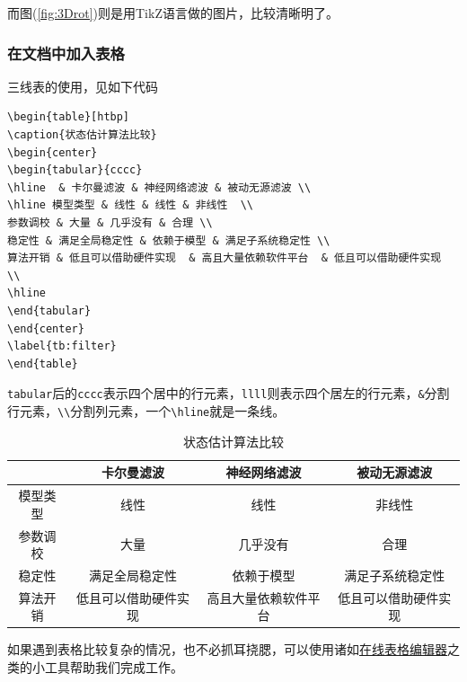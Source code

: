 而图(\ref{fig:3Drot})则是用TikZ语言做的图片，比较清晰明了。

\subsubsection{在文档中加入表格}
三线表的使用，见如下代码
\begin{lstlisting}
\begin{table}[htbp]
\caption{状态估计算法比较}
\begin{center}
\begin{tabular}{cccc}
\hline  & 卡尔曼滤波 & 神经网络滤波 & 被动无源滤波 \\ 
\hline 模型类型 & 线性 & 线性 & 非线性  \\ 
参数调校 & 大量 & 几乎没有 & 合理 \\ 
稳定性 & 满足全局稳定性 & 依赖于模型 & 满足子系统稳定性 \\ 
算法开销 & 低且可以借助硬件实现  & 高且大量依赖软件平台  & 低且可以借助硬件实现  \\ 
\hline
\end{tabular} 
\end{center}
\label{tb:filter}
\end{table}
\end{lstlisting}
\verb|tabular|后的\verb|cccc|表示四个居中的行元素，\verb|llll|则表示四个居左的行元素，\verb|&|分割行元素，\verb|\\|分割列元素，一个\verb|\hline|就是一条线。
\begin{table}[thbp]
	\caption{状态估计算法比较}
	\begin{center}
		\begin{tabular}{cccc}
			\hline  & 卡尔曼滤波 & 神经网络滤波 & 被动无源滤波 \\ 
			\hline 模型类型 & 线性 & 线性 & 非线性  \\ 
			参数调校 & 大量 & 几乎没有 & 合理 \\ 
			稳定性 & 满足全局稳定性 & 依赖于模型 & 满足子系统稳定性 \\ 
			算法开销 & 低且可以借助硬件实现  & 高且大量依赖软件平台  & 低且可以借助硬件实现  \\ 
			\hline
		\end{tabular} 
	\end{center}
	\label{tb:filter}
\end{table}

如果遇到表格比较复杂的情况，也不必抓耳挠腮，可以使用诸如\href{http://www.tablesgenerator.com}{在线表格编辑器}之类的小工具帮助我们完成工作。

